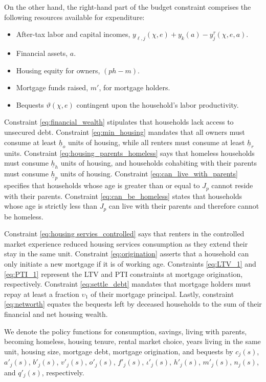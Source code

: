 \documentclass[parskip=full]{article}
\begin{document}
On the other hand, the right-hand part of the budget constraint comprises the following resources available for expenditure:
\begin{itemize}
    \item After-tax labor and capital incomes, $y_{\ell,j}(\chi,e)+y_{k}(a)-y^{\tau}_{j}(\chi,e,a)$.
    \item Financial assets, $a$.
    \item Housing equity for owners, $(ph-m)$.
    \item Mortgage funds raised, $m'$, for mortgage holders.
    \item Bequests $\vartheta(\chi,e)$ contingent upon the household's labor productivity.
\end{itemize} 

Constraint \eqref{eq:financial_wealth} stipulates that households lack access to unsecured debt. Constraint \eqref{eq:min_housing} mandates that all owners must consume at least $\underline{h}_{o}$ units of housing, while all renters must consume at least $\underline{h}_{r}$ units. Constraint \eqref{eq:housing_parents_homeless} says that homeless households must consume $\underline{h}_{h}$ units of housing, and households cohabiting with their parents must consume $\underline{h}_{p}$ units of housing. Constraint \eqref{eq:can_live_with_parents} specifies that households whose age is greater than or equal to $J_{p}$ cannot reside with their parents. Constraint \eqref{eq:can_be_homeless} states that households whose age is strictly less than $J_{p}$ can live with their parents and therefore cannot be homeless.

Constraint \eqref{eq:housing servies_controlled} says that renters in the controlled market experience reduced housing services consumption as they extend their stay in the same unit. Constraint \eqref{eq:origination} asserts that a household can only initiate a new mortgage if it is of working age. Constraints \eqref{eq:LTV_1} and \eqref{eq:PTI_1} represent the LTV and PTI constraints at mortgage origination, respectively. Constraint \eqref{eq:settle_debt} mandates that mortgage holders must repay at least a fraction $\upsilon_{1}$ of their mortgage principal. Lastly, constraint \eqref{eq:networth} equates the bequests left by deceased households to the sum of their financial and net housing wealth.

We denote the policy functions for consumption, savings, living with parents, becoming homeless, housing tenure, rental market choice, years living in the same unit, housing size, mortgage debt, mortgage origination, and bequests by $c_{j}(s)$, $a'_{j}(s)$, $b'_{j}(s)$, $v'_{j}(s)$, $o'_{j}(s)$, $f'_{j}(s)$, $\iota'_{j}(s)$, $h'_{j}(s)$, $m'_{j}(s)$, $n_{j}(s)$, and $q'_{j}(s)$, respectively.
\end{document}
